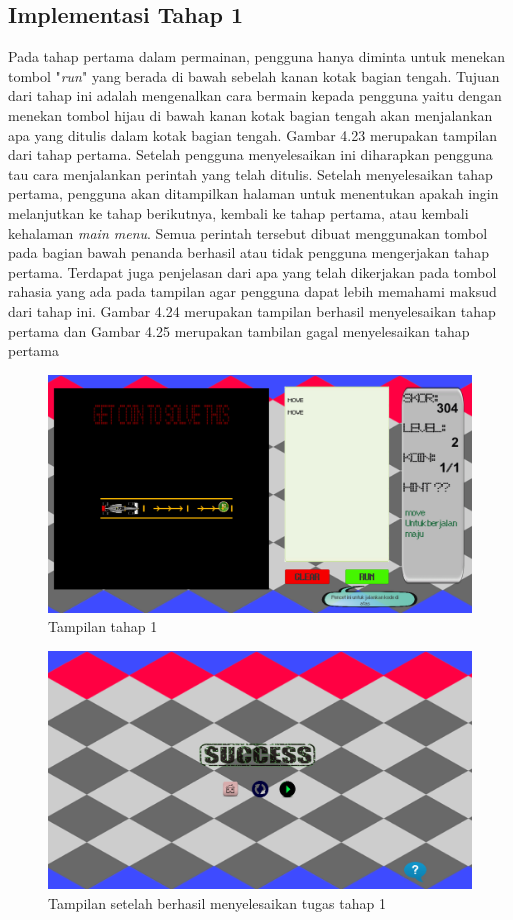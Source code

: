 	\subsection{Implementasi Tahap 1}
	Pada tahap pertama dalam permainan, pengguna hanya diminta untuk menekan tombol "\textit{run}" yang berada di bawah sebelah kanan kotak bagian tengah. Tujuan dari tahap ini adalah mengenalkan cara bermain kepada pengguna yaitu dengan menekan tombol hijau di bawah kanan kotak bagian tengah akan menjalankan apa yang ditulis dalam kotak bagian tengah. Gambar 4.23 merupakan tampilan dari tahap pertama.
	\linebreak\linebreak
	Setelah pengguna menyelesaikan ini diharapkan pengguna tau cara menjalankan perintah yang telah ditulis. Setelah menyelesaikan tahap pertama, pengguna akan ditampilkan halaman untuk menentukan apakah ingin melanjutkan ke tahap berikutnya, kembali ke tahap pertama, atau kembali kehalaman \textit{main menu}. Semua perintah tersebut dibuat menggunakan tombol pada bagian bawah penanda berhasil atau tidak pengguna mengerjakan tahap pertama. Terdapat juga penjelasan dari apa yang telah dikerjakan pada tombol rahasia yang ada pada tampilan agar pengguna dapat lebih memahami maksud dari tahap ini. Gambar 4.24 merupakan tampilan berhasil menyelesaikan tahap pertama dan Gambar 4.25 merupakan tambilan gagal menyelesaikan tahap pertama
	\begin{figure}
		\centering
		\includegraphics[width=\linewidth-40pt]{pics/prototipe/tahap1}
		\caption{Tampilan tahap 1}
	\end{figure}
	\begin{figure}
		\centering
		\includegraphics[width=\linewidth-40pt]{pics/prototipe/ending1}
		\caption{Tampilan setelah berhasil menyelesaikan tugas tahap 1}
	\end{figure}
